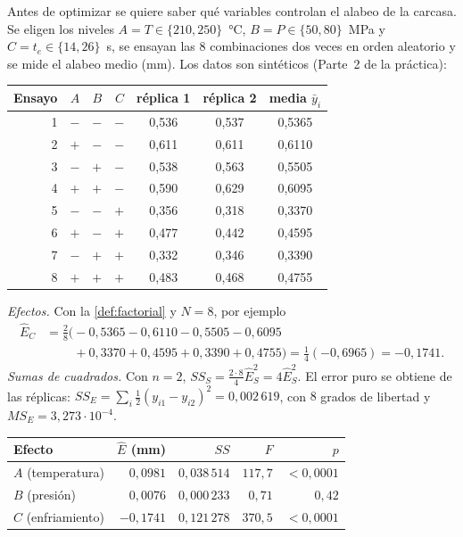 \begin{ejemplo}\label{ej:factorial}
Antes de optimizar se quiere saber qué variables controlan el alabeo de la carcasa. Se eligen los niveles $A=T\in\{210,250\}$~°C, $B=P\in\{50,80\}$~MPa y $C=t_e\in\{14,26\}$~s, se ensayan las 8 combinaciones dos veces en orden aleatorio y se mide el alabeo medio (mm). Los datos son sintéticos (Parte~2 de la práctica):
\begin{center}\small
\begin{tabular}{@{}rrrrccc@{}}
\toprule
Ensayo & $A$ & $B$ & $C$ & réplica 1 & réplica 2 & media $\bar y_i$ \\
\midrule
1 & $-$ & $-$ & $-$ & 0,536 & 0,537 & 0,5365 \\
2 & $+$ & $-$ & $-$ & 0,611 & 0,611 & 0,6110 \\
3 & $-$ & $+$ & $-$ & 0,538 & 0,563 & 0,5505 \\
4 & $+$ & $+$ & $-$ & 0,590 & 0,629 & 0,6095 \\
5 & $-$ & $-$ & $+$ & 0,356 & 0,318 & 0,3370 \\
6 & $+$ & $-$ & $+$ & 0,477 & 0,442 & 0,4595 \\
7 & $-$ & $+$ & $+$ & 0,332 & 0,346 & 0,3390 \\
8 & $+$ & $+$ & $+$ & 0,483 & 0,468 & 0,4755 \\
\bottomrule
\end{tabular}
\end{center}
\emph{Efectos.} Con la \cref{def:factorial} y $N=8$, por ejemplo
\begin{align*}
\hat E_C&=\tfrac{2}{8}\bigl(-0{,}5365-0{,}6110-0{,}5505-0{,}6095\\
&\qquad\ +0{,}3370+0{,}4595+0{,}3390+0{,}4755\bigr)=\tfrac14(-0{,}6965)=-0{,}1741 .
\end{align*}
\emph{Sumas de cuadrados.} Con $n=2$, $SS_S=\frac{2\cdot 8}{4}\hat E_S^2=4\hat E_S^2$. El error puro se obtiene de las réplicas: $SS_E=\sum_i\frac12(y_{i1}-y_{i2})^2=0{,}002\,619$, con $8$ grados de libertad y $MS_E=3{,}273\cdot10^{-4}$.
\begin{center}\small
\begin{tabular}{@{}lrrrr@{}}
\toprule
Efecto & $\hat E$ (mm) & $SS$ & $F$ & $p$ \\
\midrule
$A$ (temperatura) & $0{,}0981$ & $0{,}038\,514$ & $117{,}7$ & $<0{,}0001$ \\
$B$ (presión) & $0{,}0076$ & $0{,}000\,233$ & $0{,}71$ & $0{,}42$ \\
$C$ (enfriamiento) & $-0{,}1741$ & $0{,}121\,278$ & $370{,}5$ & $<0{,}0001$ \\

\end{tabular}
\end{center}
\end{ejemplo}
